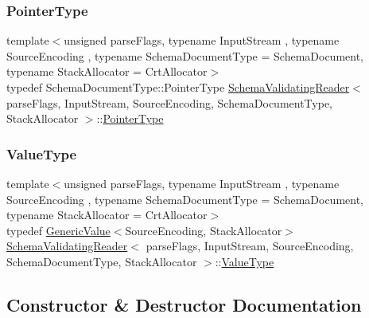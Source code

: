 \subsubsection{\texorpdfstring{Pointer\+Type}{PointerType}}
{\footnotesize\ttfamily template$<$unsigned parse\+Flags, typename Input\+Stream , typename Source\+Encoding , typename Schema\+Document\+Type  = Schema\+Document, typename Stack\+Allocator  = Crt\+Allocator$>$ \\
typedef Schema\+Document\+Type\+::\+Pointer\+Type \hyperlink{classSchemaValidatingReader}{Schema\+Validating\+Reader}$<$ parse\+Flags, Input\+Stream, Source\+Encoding, Schema\+Document\+Type, Stack\+Allocator $>$\+::\hyperlink{classSchemaValidatingReader_a30ecf1b20ca5a1b79e0d5f4ceb3bf198}{Pointer\+Type}}

\mbox{\label{classSchemaValidatingReader_af08b51fcef602c68d95769c35ae606be}} 
\subsubsection{\texorpdfstring{Value\+Type}{ValueType}}
{\footnotesize\ttfamily template$<$unsigned parse\+Flags, typename Input\+Stream , typename Source\+Encoding , typename Schema\+Document\+Type  = Schema\+Document, typename Stack\+Allocator  = Crt\+Allocator$>$ \\
typedef \hyperlink{classGenericValue}{Generic\+Value}$<$Source\+Encoding, Stack\+Allocator$>$ \hyperlink{classSchemaValidatingReader}{Schema\+Validating\+Reader}$<$ parse\+Flags, Input\+Stream, Source\+Encoding, Schema\+Document\+Type, Stack\+Allocator $>$\+::\hyperlink{classSchemaValidatingReader_af08b51fcef602c68d95769c35ae606be}{Value\+Type}}



\subsection{Constructor \& Destructor Documentation}
\mbox{\label{classSchemaValidatingReader_ae7945b71687ad3dd13b9c3d096892eac}} 
